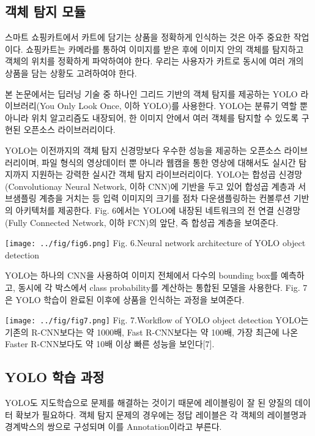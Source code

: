 \documentclass[smallextended]{svjour3}       %
\begin{document}
\hypertarget{uxac1duxccb4-uxd0d0uxc9c0-uxbaa8uxb4c8}{%
\subsection{객체 탐지
모듈}\label{uxac1duxccb4-uxd0d0uxc9c0-uxbaa8uxb4c8}}

스마트 쇼핑카트에서 카트에 담기는 상품을 정확하게 인식하는 것은 아주
중요한 작업이다. 쇼핑카트는 카메라를 통하여 이미지를 받은 후에 이미지
안의 객체를 탐지하고 객체의 위치를 정확하게 파악하여야 한다. 우리는
사용자가 카트로 동시에 여러 개의 상품을 담는 상황도 고려하여야 한다.

본 논문에서는 딥러닝 기술 중 하나인 그리드 기반의 객체 탐지를 제공하는
YOLO 라이브러리(You Only Look Once, 이하 YOLO)를 사용한다. YOLO는 분류기
역할 뿐 아니라 위치 알고리즘도 내장되어, 한 이미지 안에서 여러 객체를
탐지할 수 있도록 구현된 오픈소스 라이브러리이다\cite{redmon2016you}.

YOLO는 이전까지의 객체 탐지 신경망보다 우수한 성능을 제공하는 오픈소스
라이브러리이며, 파일 형식의 영상데이터 뿐 아니라 웹캠을 통한 영상에
대해서도 실시간 탐지까지 지원하는 강력한 실시간 객체 탐지
라이브러리이다. YOLO는 합성곱 신경망(Convolutionay Neural Network, 이하
CNN)에 기반을 두고 있어 합성곱 계층과 서브샘플링 계층을 거치는 등 입력
이미지의 크기를 점차 다운샘플링하는 컨볼루션 기반의 아키텍처를 제공한다.
Fig. 6에서는 YOLO에 내장된 네트워크의 전 연결 신경망(Fully Connected
Network, 이하 FCN)의 앞단, 즉 합성곱 계층을 보여준다.

\texttt{[image: ../fig/fig6.png]} Fig. 6.Neural network architecture of
YOLO object detection

YOLO는 하나의 CNN을 사용하여 이미지 전체에서 다수의 bounding box를
예측하고, 동시에 각 박스에서 class probability를 계산하는 통합된 모델을
사용한다. Fig. 7은 YOLO 학습이 완료된 이후에 상품을 인식하는 과정을
보여준다.

\texttt{[image: ../fig/fig7.png]} Fig. 7.Workflow of YOLO object
detection YOLO는 기존의 R-CNN보다는 약 1000배, Fast R-CNN보다는 약
100배, 가장 최근에 나온 Faster R-CNN보다도 약 10배 이상 빠른 성능을
보인다{[}7{]}.

\hypertarget{yolo-uxd559uxc2b5-uxacfcuxc815}{%
\subsection{YOLO 학습 과정}\label{yolo-uxd559uxc2b5-uxacfcuxc815}}

YOLO도 지도학습으로 문제를 해결하는 것이기 때문에 레이블링이 잘 된
양질의 데이터 확보가 필요하다. 객체 탐지 문제의 경우에는 정답 레이블은
각 객체의 레이블명과 경계박스의 쌍으로 구성되며 이를 Annotation이라고
부른다.
\end{document}
